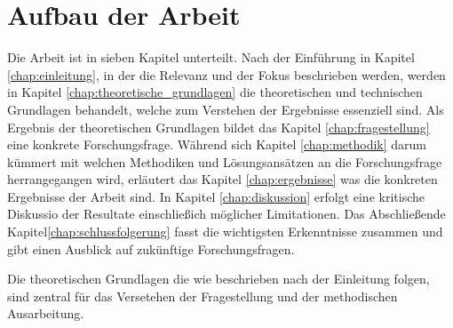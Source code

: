 \section{Aufbau der Arbeit}
\label{sec:aufbau_der_arbeit} Die Arbeit ist in sieben Kapitel unterteilt. Nach
der Einführung in Kapitel \ref{chap:einleitung}, in der die Relevanz und der Fokus
beschrieben werden, werden in Kapitel \ref{chap:theoretische_grundlagen} die
theoretischen und technischen Grundlagen behandelt, welche zum Verstehen der Ergebnisse
essenziell sind. Als Ergebnis der theoretischen Grundlagen bildet das Kapitel
\ref{chap:fragestellung} eine konkrete Forschungsfrage. Während sich Kapitel \ref{chap:methodik}
darum kümmert mit welchen Methodiken und Lösungsansätzen an die Forschungsfrage herrangegangen
wird, erläutert das Kapitel \ref{chap:ergebnisse} was die konkreten Ergebnisse
der Arbeit sind. In Kapitel \ref{chap:diskussion} erfolgt eine kritische Diskussio
der Resultate einschließich möglicher Limitationen. Das Abschließende Kapitel\ref{chap:schlussfolgerung}
fasst die wichtigsten Erkenntnisse zusammen und gibt einen Ausblick auf zukünftige
Forschungsfragen.

Die theoretischen Grundlagen die wie beschrieben nach der Einleitung folgen,
sind zentral für das Versetehen der Fragestellung und der methodischen
Ausarbeitung.
